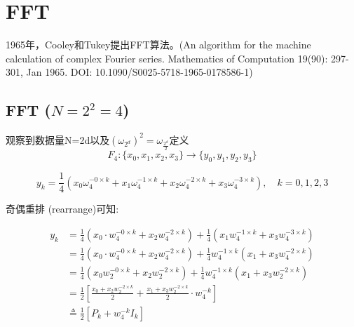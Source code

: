 \documentclass[linespread=1.5,openany]{book}%
\theoremstyle{plain}
\begin{document}
{{				\chapter{FFT}{
					1965年，Cooley和Tukey提出FFT算法。(An algorithm for the machine calculation of complex Fourier series. Mathematics of Computation 19(90): 297-301, Jan 1965.
					DOI: 10.1090/S0025-5718-1965-0178586-1)	
					\section{ FFT ($N=2^2=4$)}
					观察到数据量N=2d以及$(\omega_{2^d})^2=\omega_{ \frac{2^d}{2}}$定义
					\begin{equation}
						F_4: \{x_0, x_1, x_2, x_3\} \rightarrow \{y_0, y_1, y_2, y_3\}
					\end{equation}
					
					\begin{equation}
						y_k = \frac{1}{4} \left( x_0 \omega_4^{-0 \times k} + x_1 \omega_4^{-1 \times k} + x_2 \omega_4^{-2 \times k} + x_3 \omega_4^{-3 \times k} \right), \quad k = 0, 1, 2, 3
					\end{equation}
					
					奇偶重排 (rearrange)可知:
					
					\begin{equation}
						\begin{aligned}
							y_k&=\frac{1}{4}(x_0\cdot w_4^{-0\times k}+x_2 w_4^{-2\times k})+\frac{1}{4}(x_1 w_4^{-1\times k}+x_3 w_4^{-3\times k})\\
							&=\frac{1}{4}(x_0\cdot w_4^{-0\times k}+x_2 w_4^{-2\times k})+\frac{1}{4}w_4^{-1\times k}(x_1 + x_3 w_4^{-2\times k})\\
							&=\frac{1}{4}(x_0 w_2^{-0\times k}+x_2 w_2^{-2\times k})+\frac{1}{4}w_4^{-1\times k}(x_1 + x_3 w_2^{-2\times k})\\
							&=\frac{1}{2}\left[\frac{x_0 + x_2 w_2^{-2\times k}}{2}+\frac{x_1 + x_3 w_2^{-2\times k}}{2}\cdot w_4^{-k}\right]\\
							&\triangleq\frac{1}{2}[P_k + w_4^{-k}I_k]
						\end{aligned}
					\end{equation}
					
}}}
\end{document}
